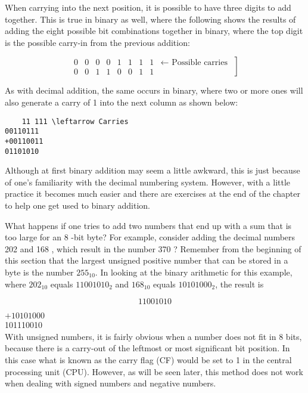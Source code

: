 \documentclass[10pt]{article}
\begin{document}
When carrying into the next position, it is possible to have three digits to add together. This is true in binary as well, where the following shows the results of adding the eight possible bit combinations together in binary, where the top digit is the possible carry-in from the previous addition:

$$
\left.\begin{array}{rrrrrrrrr}
0 & 0 & 0 & 0 & 1 & 1 & 1 & 1 & \leftarrow \text { Possible carries } \\
0 & 0 & 1 & 1 & 0 & 0 & 1 & 1
\end{array}\right]
$$

As with decimal addition, the same occurs in binary, where two or more ones will also generate a carry of 1 into the next column as shown below:

\begin{verbatim}
    11 111 \leftarrow Carries
00110111
+00110011
01101010
\end{verbatim}

Although at first binary addition may seem a little awkward, this is just because of one's familiarity with the decimal numbering system. However, with a little practice it becomes much easier and there are exercises at the end of the chapter to help one get used to binary addition.

What happens if one tries to add two numbers that end up with a sum that is too large for an 8 -bit byte? For example, consider adding the decimal numbers 202 and 168 , which result in the number 370 ? Remember from the beginning of this section that the largest unsigned positive number that can be stored in a byte is the number $255_{10}$. In looking at the binary arithmetic for this example, where $202_{10}$ equals $11001010_{2}$ and $168_{10}$ equals $10101000_{2}$, the result is

$$
11001010
$$

$+10101000$\\
101110010\\
With unsigned numbers, it is fairly obvious when a number does not fit in 8 bits, because there is a carry-out of the leftmost or most significant bit position. In this case what is known as the carry flag (CF) would be set to 1 in the central processing unit (CPU). However, as will be seen later, this method does not work when dealing with signed numbers and negative numbers.
\end{document}
